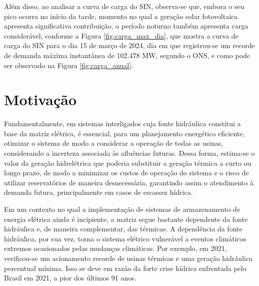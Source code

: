 Além disso, ao analisar a curva de carga do SIN, observa-se que, embora o seu pico ocorra no início da 
tarde, momento no qual a geração solar fotovoltaica apresenta significativa contribuição, o período noturno também 
apresenta carga considerável, conforme a Figura \ref{fig:carga_max_dia}, que mostra a curva de carga do SIN para o 
dia 15 de março de 2024, dia em que registrou-se um recorde de demanda máxima instantânea de 102.478 MW, segundo o ONS, 
e como pode ser observado na Figura \ref{fig:carga_anual}.

\begin{figure}[!ht]
	{}
	{}
\end{figure}

\section{Motivação}
Fundamentalmente, em sistemas interligados cuja fonte hidráulica constitui a base da matriz elétrica, é essencial, 
para um planejamento energético eficiente, otimizar o sistema de modo a considerar a operação de todas as usinas, 
considerando a incerteza associada às afluências futuras. Dessa forma, estima-se o valor da geração hidrelétrica que 
poderia substituir a geração térmica a curto ou longo prazo, de modo a minimizar os custos de operação do sistema e o 
risco de utilizar reservatórios de maneira desnecessária, garantindo assim o atendimento à demanda futura, 
principalmente em casos de escassez hídrica.

\begin{figure}[!ht]
	{}
	{}
\end{figure}

Em um contexto no qual a implementação de sistemas de armazenamento de energia elétrica ainda é incipiente,
a matriz segue bastante dependente da fonte hidráulica e, de maneira complementar, das térmicas. A dependência da fonte
hidráulica, por sua vez, torna o sistema elétrico vulnerável a eventos climáticos extremos ocasionados pelas mudanças
climáticas. Por exemplo, em 2021, verificou-se um acionamento recorde de usinas térmicas e uma geração hidráulica 
percentual mínima. Isso se deve em razão da forte crise hídrica enfrentada pelo Brasil em 2021, a pior dos últimos 91 
anos. \cite{Soares2023}

